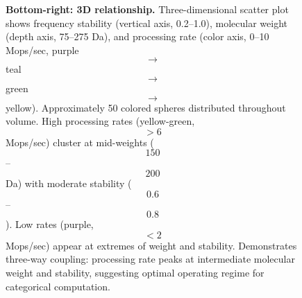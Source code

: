 \begin{figure}[htbp]
{    \textbf{Bottom-right: 3D relationship.} Three-dimensional scatter plot shows frequency stability (vertical axis, 0.2--1.0), molecular weight (depth axis, 75--275 Da), and processing rate (color axis, 0--10 Mops/sec, purple $$\to$$ teal $$\to$$ green $$\to$$ yellow). Approximately 50 colored spheres distributed throughout volume. High processing rates (yellow-green, $$> 6$$ Mops/sec) cluster at mid-weights ($$150$$--$$200$$ Da) with moderate stability ($$0.6$$--$$0.8$$). Low rates (purple, $$< 2$$ Mops/sec) appear at extremes of weight and stability. Demonstrates three-way coupling: processing rate peaks at intermediate molecular weight and stability, suggesting optimal operating regime for categorical computation.}
    \label{fig:clock_properties_analysis}
    \end{figure}

